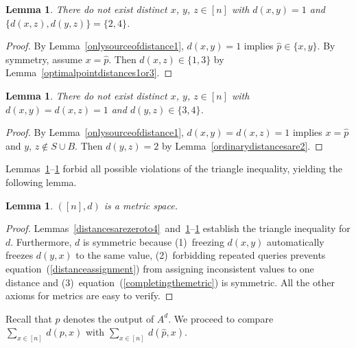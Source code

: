 \documentclass[letterpaper,12pt]{article}
\newtheorem{lemma}[theorem]{Lemma}
\begin{document}
\begin{lemma}\label{illegaldistances1}
There do not exist distinct $x$, $y$, $z\in[n]$
with $d(x,y)=1$ and $\{d(x,z), d(y,z)\}=\{2, 4\}$.
\end{lemma}
\begin{proof}
By Lemma~\ref{onlysourceofdistance1},
$d(x,y)=1$ implies $\hat{p}\in\{x,y\}$.
By symmetry, assume $x=\hat{p}$.
Then $d(x,z)\in\{1,3\}$ by
Lemma~\ref{optimalpointdistances1or3}.
\end{proof}

\begin{lemma}\label{illegaldistances2}
There do not exist distinct $x$, $y$, $z\in[n]$
with $d(x,y)=d(x,z)=1$ and $d(y,z)\in\{3, 4\}$.
\end{lemma}
\begin{proof}
By Lemma~\ref{onlysourceofdistance1},
$d(x,y)=d(x,z)=1$ implies $x=\hat{p}$ and $y$, $z\notin S\cup B$.
Then $d(y,z)=2$ by
Lemma~\ref{ordinarydistancesare2}.
\end{proof}


Lemmas~\ref{illegaldistances1}--\ref{illegaldistances2}
forbid all possible violations of the triangle inequality,
yielding the following lemma.


\begin{lemma}\label{itismetric}
$([n],d)$ is a metric space.
\end{lemma}
\begin{proof}
Lemmas~\ref{distancesarezeroto4}~and~\ref{illegaldistances1}--\ref{illegaldistances2}
establish the triangle inequality for $d$.
Furthermore, $d$ is symmetric because (1)~freezing $d(x,y)$ automatically
freezes $d(y,x)$ to the same value,
(2)~forbidding
repeated queries
prevents equation~(\ref{distanceassignment})
from assigning inconsistent values to one distance and
(3)~equation~(\ref{completingthemetric}) is symmetric.
All the other axioms for metrics
are easy to verify.
\end{proof}

Recall that $p$ denotes the output of $A^d$.
We proceed to
compare $\sum_{x\in[n]}\,d(p,x)$ with $\sum_{x\in[n]}\,d(\hat{p},x)$.
\end{document}
